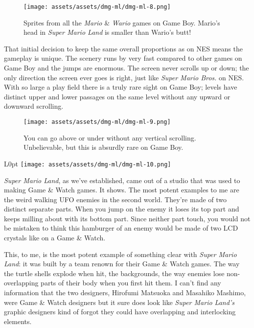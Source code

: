 \documentclass{book}
\begin{document}
\begin{figure}[hbt]
\vskip 10pt
\centering \texttt{[image: assets/assets/dmg-ml/dmg-ml-8.png]}\par\pagetwodescription Sprites from all the \emph{Mario} \& \emph{Wario} games on Game Boy. Mario’s head in \emph{Super Mario Land} is smaller than Wario’s butt!
\vskip 6pt
\end{figure}

That initial decision to keep the same overall proportions as on NES means the gameplay is unique. The scenery runs by very fast compared to other games on Game Boy and the jumps are enormous. The screen never scrolls up or down; the only direction the screen ever goes is right, just like \emph{Super Mario Bros.} on NES. With so large a play field there is a truly rare sight on Game Boy; levels have distinct upper and lower passages on the same level without any upward or downward scrolling.

\begin{figure}[hbt]
\vskip 10pt
\centering \texttt{[image: assets/assets/dmg-ml/dmg-ml-9.png]}\par\pagetwodescription You can go above or under without any vertical scrolling. Unbelievable, but this is absurdly rare on Game Boy.
\vskip 6pt
\end{figure}

\begin{wrapfigure}{L}{0pt} \texttt{[image: assets/assets/dmg-ml/dmg-ml-10.png]}\end{wrapfigure}
\emph{Super Mario Land}, as we’ve established, came out of a studio that was used to making Game \& Watch games. It shows. The most potent examples to me are the weird walking UFO enemies in the second world. They’re made of two distinct separate parts. When you jump on the enemy it loses its top part and keeps milling about with its bottom part. Since neither part touch, you would not be mistaken to think this hamburger of an enemy would be made of two LCD crystals like on a Game \& Watch.

This, to me, is the most potent example of something clear with \emph{Super Mario Land}: it was built by a team renown for their Game \& Watch games. The way the turtle shells explode when hit, the backgrounds, the way enemies lose non-overlapping parts of their body when you first hit them. I can’t find any information that the two designers, Hirofumi Matsuoka and Masahiko Mashimo, were Game \& Watch designers but it sure does look like \emph{Super Mario Land’s} graphic designers kind of forgot they could have overlapping and interlocking elements.
\end{document}
